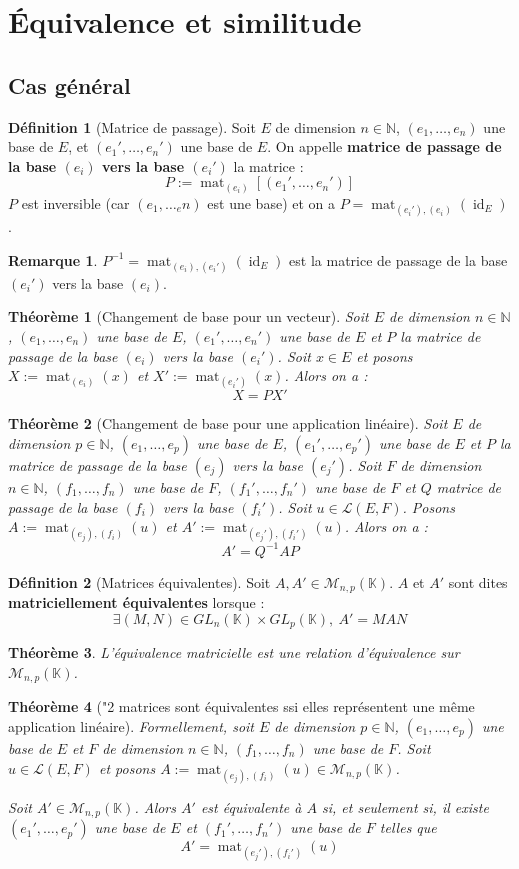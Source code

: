 \documentclass[french]{book}
\newcommand{\N}{\mathbb{N}}
\newcommand{\K}{\mathbb{K}}
\newcommand{\inv}{^{-1}}
\theoremstyle{plain}
\newtheorem{thm}{Théorème}[chapter]
\theoremstyle{definition}
\newtheorem{dfn}{Définition}[chapter]
\newtheorem{rmq}{Remarque}[chapter]
\theoremstyle{remark}
\DeclareMathOperator{\id}{id}
\DeclareMathOperator{\mat}{mat}
\begin{document}
\section{Équivalence et similitude}
\subsection{Cas général}
\begin{dfn}[Matrice de passage]
	Soit $E$ de dimension $n\in\N$, $(e_1,\ldots,e_n)$ une base de $E$, et $(e_1',\ldots,e_n')$ une base de $E$. On appelle \textbf{matrice de passage de la base $(e_i)$ vers la base $(e_i')$} la matrice : $$P:=\mat_{(e_i)}\left[\left(e_1',\ldots,e_n'\right)\right]$$ $P$ est inversible (car $(e_1,\ldots_en)$ est une base) et on a $P=\mat_{(e_i'),(e_i)}(\id_E)$.
\end{dfn}
\begin{rmq}
	$P\inv=\mat_{(e_i),(e_i')}(\id_E)$ est la matrice de passage de la base $(e_i')$ vers la base $(e_i)$.
\end{rmq}
\begin{thm}[Changement de base pour un vecteur]
		Soit $E$ de dimension $n\in\N$, $(e_1,\ldots,e_n)$ une base de $E$, $(e_1',\ldots,e_n')$ une base de $E$ et $P$ la matrice de passage de la base $(e_i)$ vers la base $(e_i')$. Soit $x\in E$ et posons $X:=\mat_{(e_i)}(x)$ et $X':=\mat_{(e_i')}(x)$. Alors on a : $$X=PX'$$
\end{thm}
\begin{thm}[Changement de base pour une application linéaire]
	Soit $E$ de dimension $p\in\N$, $(e_1,\ldots,e_p)$ une base de $E$, $(e_1',\ldots,e_p')$ une base de $E$ et $P$ la matrice de passage de la base $(e_j)$ vers la base $(e_j')$. Soit $F$ de dimension $n\in\N$, $(f_1,\ldots,f_n)$ une base de $F$, $(f_1',\ldots,f_n')$ une base de $F$ et $Q$ matrice de passage de la base $(f_i)$ vers la base $(f_i')$. Soit $u\in\mathcal{L}(E,F)$. Posons $A:=\mat_{(e_j),(f_i)}(u)$ et $A':=\mat_{(e_j'),(f_i')}(u)$. Alors on a : $$A'=Q\inv A P$$
\end{thm}
\begin{dfn}[Matrices équivalentes]
	Soit $A,A'\in\mathcal{M}_{n,p}(\K)$. $A$ et $A'$ sont dites \textbf{matriciellement équivalentes} lorsque : $$\exists(M,N)\in GL_n(\K)\times GL_p(\K),\ A'=MAN$$
\end{dfn}
\begin{thm}
	L'équivalence matricielle est une relation d'équivalence sur $\mathcal{M}_{n,p}(\K)$.
\end{thm}
\begin{thm}["2 matrices sont équivalentes ssi elles représentent une même application linéaire]
	Formellement, soit $E$ de dimension $p\in\N$, $(e_1,\ldots,e_p)$ une base de $E$ et $F$ de dimension $n\in\N$, $(f_1,\ldots,f_n)$ une base de $F$. Soit $u\in\mathcal{L}(E,F)$ et posons $A:=\mat_{(e_j),(f_i)}(u)\in\mathcal{M}_{n,p}(\K)$. \par Soit $A'\in\mathcal{M}_{n,p}(\K)$. Alors $A'$ est équivalente à $A$ si, et seulement si, il existe $(e_1',\ldots,e_p')$ une base de $E$ et $(f_1',\ldots,f_n')$ une base de $F$ telles que $$A'=\mat_{(e_j'),(f_i')}(u)$$
\end{thm}
\end{document}
